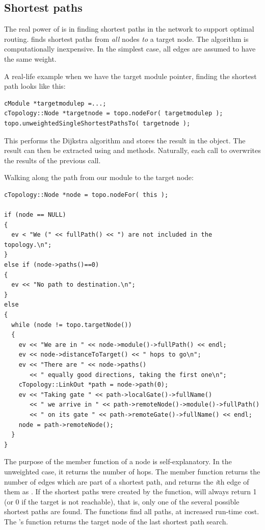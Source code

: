 \subsection{Shortest paths}

The real power of  is in finding shortest
paths in the network to support optimal
routing.  finds shortest paths
from \textit{all} nodes \textit{to} a target node. The algorithm is
computationally inexpensive. In the simplest case, all edges are
assumed to have the same weight.

A real-life example when we have the target module pointer, finding
the shortest path looks like this:

\begin{verbatim}
cModule *targetmodulep =...;
cTopology::Node *targetnode = topo.nodeFor( targetmodulep );
topo.unweightedSingleShortestPathsTo( targetnode );
\end{verbatim}


This performs the Dijkstra algorithm and
stores the result in the  object. The result can
then be extracted using  and
 methods.  Naturally, each call to
 overwrites the results of
the previous call.

Walking along the path from our module to the target node:

\begin{verbatim}
cTopology::Node *node = topo.nodeFor( this );

if (node == NULL)
{
  ev < "We (" << fullPath() << ") are not included in the topology.\n";
}
else if (node->paths()==0)
{
  ev << "No path to destination.\n";
}
else
{
  while (node != topo.targetNode())
  {
    ev << "We are in " << node->module()->fullPath() << endl;
    ev << node->distanceToTarget() << " hops to go\n";
    ev << "There are " << node->paths()
       << " equally good directions, taking the first one\n";
    cTopology::LinkOut *path = node->path(0);
    ev << "Taking gate " << path->localGate()->fullName()
       << " we arrive in " << path->remoteNode()->module()->fullPath()
       << " on its gate " << path->remoteGate()->fullName() << endl;
    node = path->remoteNode();
  }
}
\end{verbatim}


The purpose of the  member function of a
node is self-explanatory. In the unweighted case, it returns the
number of hops. The  member function returns the number
of edges which are part of a shortest path, and
 returns the \textit{i}th edge of them as
. If the shortest paths were created by the
 function,
 will always return 1 (or 0 if the target is not
reachable), that is, only one of the several possible shortest paths
are found.  The
 functions
find all paths, at increased run-time cost. The 's
 function returns the target node of the last
shortest path search.

